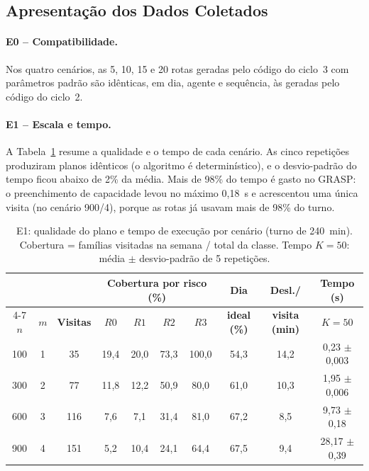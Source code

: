 \documentclass[11pt,a4paper]{article}
\begin{document}
\subsection{Apresentação dos Dados Coletados}

\paragraph{E0 -- Compatibilidade.} Nos quatro cenários, as 5, 10, 15 e 20 rotas geradas pelo código do ciclo~3 com parâmetros padrão são idênticas, em dia, agente e sequência, às geradas pelo código do ciclo~2.

\paragraph{E1 -- Escala e tempo.} A Tabela~\ref{tab:escala} resume a qualidade e o tempo de cada cenário. As cinco repetições produziram planos idênticos (o algoritmo é determinístico), e o desvio-padrão do tempo ficou abaixo de 2\% da média. Mais de 98\% do tempo é gasto no GRASP: o preenchimento de capacidade levou no máximo 0,18~s e acrescentou uma única visita (no cenário 900/4), porque as rotas já usavam mais de 98\% do turno.

\begin{table}[ht]
\centering
\caption{E1: qualidade do plano e tempo de execução por cenário (turno de 240~min). Cobertura = famílias visitadas na semana / total da classe. Tempo $K{=}50$: média $\pm$ desvio-padrão de 5 repetições.}
\label{tab:escala}
\small
\begin{tabular}{@{}cccccccccc@{}}
\toprule
 & & & \multicolumn{4}{c}{\textbf{Cobertura por risco (\%)}} & \textbf{Dia} & \textbf{Desl./} & \textbf{Tempo (s)} \\
\cmidrule(lr){4-7}
$n$ & $m$ & \textbf{Visitas} & $R0$ & $R1$ & $R2$ & $R3$ & \textbf{ideal (\%)} & \textbf{visita (min)} & $K{=}50$ \\ \midrule
100 & 1 & 35  & 19,4 & 20,0 & 73,3 & 100,0 & 54,3 & 14,2 & 0,23 $\pm$ 0,003 \\
300 & 2 & 77  & 11,8 & 12,2 & 50,9 & 80,0  & 61,0 & 10,3 & 1,95 $\pm$ 0,006 \\
600 & 3 & 116 & 7,6  & 7,1  & 31,4 & 81,0  & 67,2 & 8,5  & 9,73 $\pm$ 0,18 \\
900 & 4 & 151 & 5,2  & 10,4 & 24,1 & 64,4  & 67,5 & 9,4  & 28,17 $\pm$ 0,39 \\ \bottomrule
\end{tabular}
\end{table}
\end{document}
